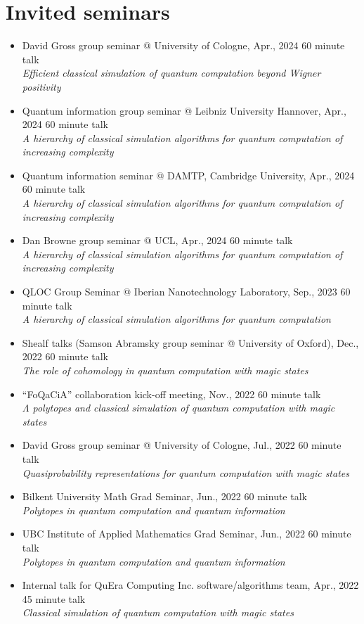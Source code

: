 \documentclass[letterpaper,11pt]{article}
\newcommand{\ConferenceItem}[3]{
	\item{\parbox{0.97\textwidth}{
		{#1}  \hfill {#2}\\
		\emph{#3}
	}}
}
\begin{document}
\section*{Invited seminars}
\begin{itemize}[leftmargin=*]
	\ConferenceItem{David Gross group seminar @ University of Cologne, Apr., 2024}{60 minute talk}{Efficient classical simulation of quantum computation beyond Wigner positivity}
	
	\ConferenceItem{Quantum information group seminar @ Leibniz University Hannover, Apr., 2024}{60 minute talk}{A hierarchy of classical simulation algorithms for quantum computation of increasing complexity}
	
	\ConferenceItem{Quantum information seminar @ DAMTP, Cambridge University, Apr., 2024}{60 minute talk}{A hierarchy of classical simulation algorithms for quantum computation of increasing complexity}
	
	\ConferenceItem{Dan Browne group seminar @ UCL, Apr., 2024}{60 minute talk}{A hierarchy of classical simulation algorithms for quantum computation of increasing complexity}
	
	\ConferenceItem{QLOC Group Seminar @ Iberian Nanotechnology Laboratory, Sep., 2023}{60 minute talk}{A hierarchy of classical simulation algorithms for quantum computation}
	
	\ConferenceItem{Shealf talks (Samson Abramsky group seminar @ University of Oxford), Dec., 2022}{60 minute talk}{The role of cohomology in quantum computation with magic states}
	
	\ConferenceItem{``FoQaCiA'' collaboration kick-off meeting, Nov., 2022}{60 minute talk}{$\Lambda$ polytopes and classical simulation of quantum computation with magic states}
	
	\ConferenceItem{David Gross group seminar @ University of Cologne, Jul., 2022}{60 minute talk}{Quasiprobability representations for quantum computation with magic states}
	
	\ConferenceItem{Bilkent University Math Grad Seminar, Jun., 2022}{60 minute talk}{Polytopes in quantum computation and quantum information}
	
	\ConferenceItem{UBC Institute of Applied Mathematics Grad Seminar, Jun., 2022}{60 minute talk}{Polytopes in quantum computation and quantum information}
	
	\ConferenceItem{Internal talk for QuEra Computing Inc. software/algorithms team, Apr., 2022}{45 minute talk}{Classical simulation of quantum computation with magic states}
\end{itemize}
\end{document}
